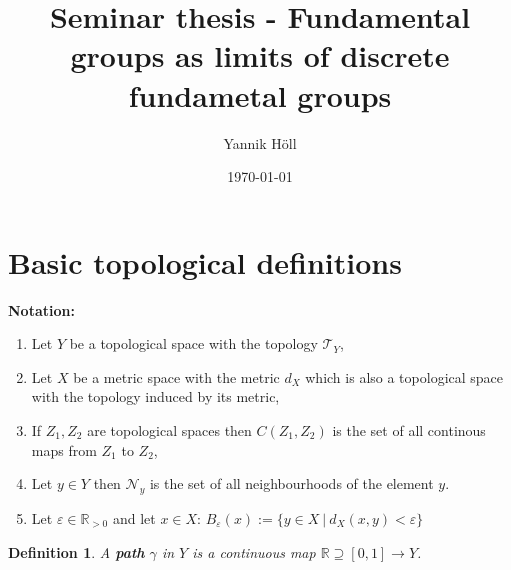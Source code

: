 \documentclass[a4paper, 11pt, twoside]{article}
\title{Seminar thesis - Fundamental groups as limits of discrete fundametal groups}
\author{Yannik Höll}
\date{\today}
\newcommand{\R}[0]{\mathbb{R}}
\newcommand{\T}[0]{\mathcal{T}}
\newcommand{\NB}[0]{\mathcal{N}}
\theoremstyle{break}
\theoremstyle{break}
\newtheorem{defin}[thm]{Definition}
\begin{document}
\nocite{*}

\maketitle


\section{Basic topological definitions} \label{section-basic-defs}


\textbf{Notation:}
\begin{enumerate}
  \item Let $Y$ be a topological space with the topology $\T_Y$,
  \item Let $X$ be a metric space with the metric $d_X$ which is also a topological space with the topology induced by its metric,
  \item If $Z_1, Z_2$ are topological spaces then $C(Z_1, Z_2)$ is the set of all continous maps from $Z_1$ to $Z_2$,
  \item Let $y \in Y$ then $\NB_y$ is the set of all neighbourhoods of the element $y$.
  \item Let $\varepsilon \in \R_{>0}$ and let $x \in X$: $B_{\varepsilon}(x) := \{ y\in X \: | \: d_X(x, y) < \varepsilon\}$
\end{enumerate}

\begin{defin}
  A \textbf{path} $\gamma$ in $Y$ is a continuous map $\R \supseteq [0,1] \to Y$.
\end{defin}
\end{document}
